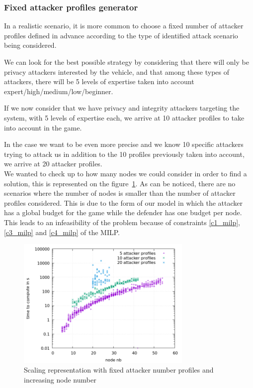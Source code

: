 \subsubsection{Fixed attacker profiles generator}

In a realistic scenario, it is more common to choose a fixed number of attacker profiles defined in advance according to the type of identified attack scenario being considered.

We can look for the best possible strategy by considering that there will only be privacy attackers interested by the vehicle, and that among these types of attackers, there will be 5 levels of expertise taken into account expert/high/medium/low/beginner. 

If we now consider that we have privacy and integrity attackers targeting the system, with 5 levels of expertise each, we arrive at 10 attacker profiles to take into account in the game.

In the case we want to be even more precise and we know 10 specific attackers trying to attack us in addition to the 10 profiles previously taken into account, we arrive at 20 attacker profiles. \\

We wanted to check up to how many nodes we could consider in order to find a solution, this is represented on the figure~\ref{fig:full}. 
As can be noticed, there are no scenarios where the number of nodes is smaller than the number of attacker profiles considered. This is due to the form of our model in which the attacker has a global budget for the game while the defender has one budget per node. This leads to an infeasibility of the problem because of constraints \ref{c1_milp}, \ref{c3_milp} and \ref{c4_milp} of the MILP. \\

\begin{figure}[h]
    \centering
    \includegraphics[width=0.75\textwidth]{schema/plot_cplex.png}
    \caption{Scaling representation with fixed attacker number profiles and increasing node number}
    \label{fig:full}
\end{figure}


